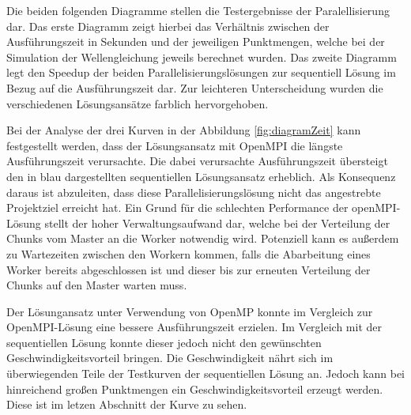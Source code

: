 Die beiden folgenden Diagramme stellen die Testergebnisse der Paralellisierung dar. Das erste Diagramm zeigt hierbei das Verhältnis zwischen der Ausführungszeit in Sekunden und der jeweiligen Punktmengen, welche bei der Simulation der Wellengleichung jeweils berechnet wurden.
Das zweite Diagramm legt den Speedup der beiden Parallelisierungslösungen zur sequentiell Lösung im Bezug auf die Ausführungszeit dar.
Zur leichteren Unterscheidung wurden die verschiedenen Lösungsansätze farblich hervorgehoben.
  
Bei der Analyse der drei Kurven in der Abbildung \ref{fig:diagramZeit} kann festgestellt werden, dass der Lösungsansatz mit OpenMPI die längste Ausführungszeit verursachte. Die dabei verursachte Ausführungszeit übersteigt den in blau dargestellten sequentiellen Lösungsansatz erheblich. Als Konsequenz daraus ist abzuleiten, dass diese Parallelisierungslösung nicht das angestrebte Projektziel erreicht hat. Ein Grund für die schlechten Performance der openMPI-Lösung stellt der hoher Verwaltungsaufwand dar, welche bei der Verteilung der Chunks vom Master an die Worker notwendig wird. Potenziell kann es außerdem zu Wartezeiten zwischen den Workern kommen, falls die Abarbeitung eines Worker bereits abgeschlossen ist und dieser bis zur erneuten Verteilung der Chunks auf den Master warten muss.

Der Lösungansatz unter Verwendung von OpenMP konnte im Vergleich zur OpenMPI-Lösung eine bessere Ausführungszeit erzielen. Im Vergleich mit der sequentiellen Lösung konnte dieser jedoch nicht den gewünschten Geschwindigkeitsvorteil bringen. Die Geschwindigkeit nährt sich im überwiegenden Teile der Testkurven der sequentiellen Lösung an. Jedoch kann bei hinreichend großen Punktmengen ein Geschwindigkeitsvorteil erzeugt werden. Diese ist im letzen Abschnitt der Kurve zu sehen.


